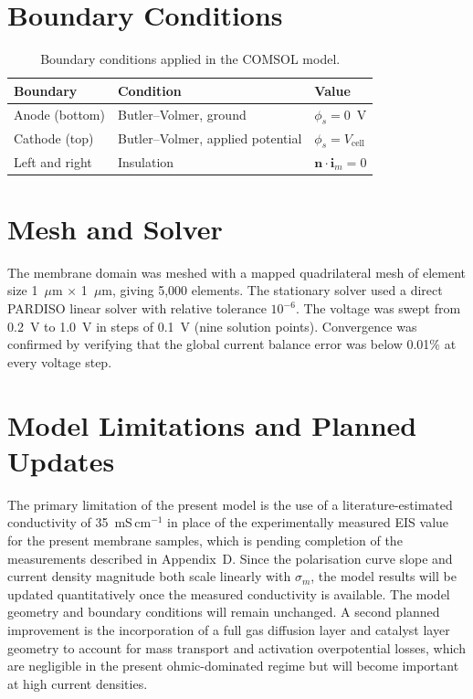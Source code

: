 \documentclass[12pt,a4paper]{report}
\begin{document}
\section{Boundary Conditions}

\begin{table}[h]
\centering
\caption{Boundary conditions applied in the COMSOL model.}
\label{tab:comsol-bc}
\begin{tabular}{lll}
\toprule
Boundary & Condition & Value \\
\midrule
Anode (bottom) & Butler--Volmer, ground & $\phi_s = 0$~V \\
Cathode (top) & Butler--Volmer, applied potential & 
$\phi_s = V_\text{cell}$ \\
Left and right & Insulation & $\mathbf{n} \cdot 
\mathbf{i}_m = 0$ \\
\bottomrule
\end{tabular}
\end{table}

\section{Mesh and Solver}

The membrane domain was meshed with a mapped quadrilateral 
mesh of element size 1~\(\mu\)m \(\times\) 1~\(\mu\)m, 
giving 5{,}000 elements. The stationary solver used a 
direct PARDISO linear solver with relative tolerance 
$10^{-6}$. The voltage was swept from 0.2~V to 1.0~V 
in steps of 0.1~V (nine solution points). Convergence 
was confirmed by verifying that the global current 
balance error was below 0.01\% at every voltage step.

\section{Model Limitations and Planned Updates}

The primary limitation of the present model is the use 
of a literature-estimated conductivity of 
35~mS\,cm\(^{-1}\) in place of the experimentally 
measured EIS value for the present membrane samples, 
which is pending completion of the measurements described 
in Appendix~D. Since the polarisation curve slope and 
current density magnitude both scale linearly with 
\(\sigma_m\), the model results will be updated 
quantitatively once the measured conductivity is 
available. The model geometry and boundary conditions 
will remain unchanged. A second planned improvement 
is the incorporation of a full gas diffusion layer 
and catalyst layer geometry to account for mass 
transport and activation overpotential losses, which 
are negligible in the present ohmic-dominated regime 
but will become important at high current densities.
\end{document}
